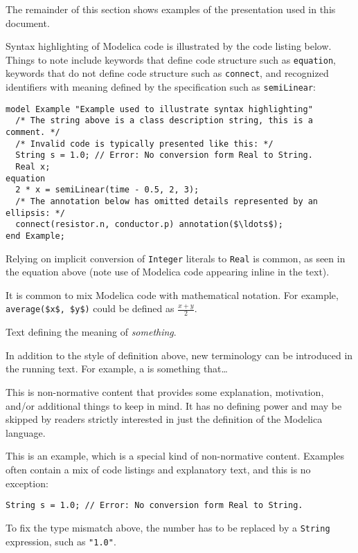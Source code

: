 The remainder of this section shows examples of the presentation used in this document.

Syntax highlighting of Modelica code is illustrated by the code listing below.
Things to note include keywords that define code structure such as \lstinline!equation!, keywords that do not define code structure such as \lstinline!connect!, and recognized identifiers with meaning defined by the specification such as \lstinline!semiLinear!:
\begin{lstlisting}[language=modelica]
model Example "Example used to illustrate syntax highlighting"
  /* The string above is a class description string, this is a comment. */
  /* Invalid code is typically presented like this: */
  String s = 1.0; // Error: No conversion form Real to String.
  Real x;
equation
  2 * x = semiLinear(time - 0.5, 2, 3);
  /* The annotation below has omitted details represented by an ellipsis: */
  connect(resistor.n, conductor.p) annotation($\ldots$);
end Example;
\end{lstlisting}

Relying on implicit conversion of \lstinline!Integer! literals to \lstinline!Real! is common, as seen in the equation above (note use of Modelica code appearing inline in the text).

It is common to mix Modelica code with mathematical notation.
For example, \lstinline!average($x$, $y$)! could be defined as $\frac{x + y}{2}$.

\begin{definition}[Something]%
Text defining the meaning of \emph{something}.
\end{definition}

In addition to the style of definition above, new terminology can be introduced in the running text.
For example, a  is something that\ldots

\begin{nonnormative}
This is non-normative content that provides some explanation, motivation, and/or additional things to keep in mind.
It has no defining power and may be skipped by readers strictly interested in just the definition of the Modelica language.
\end{nonnormative}

\begin{example}
This is an example, which is a special kind of non-normative content.
Examples often contain a mix of code listings and explanatory text, and this is no exception:
\begin{lstlisting}[language=modelica]
String s = 1.0; // Error: No conversion form Real to String.
\end{lstlisting}
To fix the type mismatch above, the number has to be replaced by a \lstinline!String! expression, such as \lstinline!"1.0"!.
\end{example}

